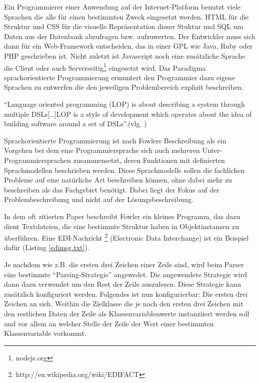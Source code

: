 \documentclass[11pt,english,ngerman, headsepline]{scrreprt}
\begin{document}
Ein Programmierer einer Anwendung auf der Internet-Platform benutzt viele
Sprachen die alle für einen bestimmten Zweck eingesetzt werden. HTML für die
Struktur und CSS für die visuelle Repräsentation dieser Stuktur und SQL um Daten
aus der Datenbank abzufragen bzw. aufzuwerten. Der Entwickler muss sich dann für
ein Web-Framework entscheiden, das in einer GPL wie
Java, Ruby oder PHP geschrieben ist. Nicht zuletzt ist Javascript noch eine
zusätzliche Sprache die Client oder auch Serverseitig\footnote{nodejs.org}
eingesetzt wird. 
Das Paradigma sprachorientierte Programmierung ermuntert den Programmier dazu
eigene Sprachen zu entwerfen die den jeweiligen Problembereich explizit
beschreiben.

``Language oriented programming (LOP) is about describing a system through
multiple DSLs[\ldots]LOP is a style of development which operates about
the idea of building software around a set of DSLs''.(vlg.
\cite{fowler2005language})

Sprachorientierte Programmierung ist nach Fowlers Beschreibung als ein Vorgehen
bei dem eine Programmiersprache sich auch mehreren Unter-Programmiersprachen
zusammensetzt, deren Funktionen mit definierten Sprachmodellen beschrieben
werden.
Diese Sprachmodelle sollen die fachlichen Probleme auf eine
natürliche Art beschreiben können, ohne dabei mehr zu beschreiben als das
Fachgebiet benötigt. Dabei liegt der Fokus auf der Problembeschreibung und nicht
auf der Lösungsbeschreibung.

In dem oft zitierten Paper beschreibt Fowler ein kleines Programm, das dazu
dient Textdateien, die eine bestimmte Struktur haben in Objektinstanzen zu
überführen.
Eine EDI-Nachricht \footnote{http://en.wikipedia.org/wiki/EDIFACT} (Electronic
Data Interchange) ist ein Beispiel dafür (Listing \ref{edimsg.txt}).



Je nachdem wie z.B. die ersten drei Zeichen einer Zeile sind, wird beim
Parser eine bestimmte ``Parsing-Strategie'' angewedet. \cite{gamma1995design}
Die angewendete Strategie wird dann dazu verwendet um den Rest der Zeile
auszulesen. Diese Strategie kann zusätzlich konfiguriert werden. 
Folgendes ist nun konfigurierbar: Die ersten drei Zeichen an sich. Weithin die
Zielklasse die je nach den ersten drei Zeichen mit den restlichen Daten der
Zeile als Klassenvariablenwerte instanziiert werden soll und vor allem an
welcher Stelle der Zeile der Wert einer bestimmten Klassenvariable vorkommt.
\end{document}
